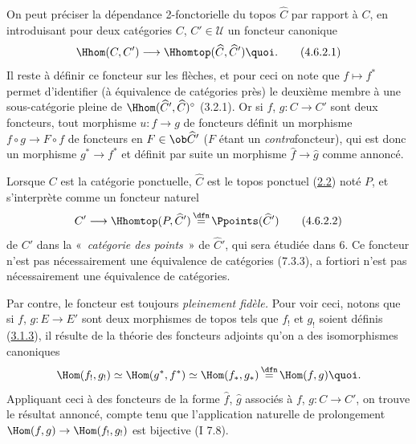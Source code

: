\documentclass[10pt]{../fichiers-configuration-latex/smfart}
\begin{document}
\subsubsection{}
On peut préciser la dépendance 2-fonctorielle du topos
$\widehat{C}$ par rapport à $C$, en introduisant pour deux
catégories $C$, $C'\in 𝒰$ un foncteur canonique
\begin{equation*}
\Hhom(C,C')\longrightarrow
\Hhomtop(\widehat{C},\widehat{C}'){\quoi}.\tag{4.6.2.1}
\end{equation*}
Il reste à définir ce foncteur sur les flèches, et pour ceci
on note que $f\mapsto f^{\ast}$ permet d'identifier (à
équivalence de catégories près) le deuxième membre à une
sous-catégorie pleine de $\Hhom(\widehat{C}',
\widehat{C})^{\circ}$ (3.2.1). Or si $f$, $g:C\rightarrow C'$ sont
deux foncteurs, tout morphisme $u:f\rightarrow g$ de foncteurs
définit un morphisme $f\circ g\rightarrow F\circ f$ de foncteurs
en $F\in \ob \widehat{C}'$ ($F$ étant un \emph{contra}foncteur),
qui est donc un morphisme $g^{\ast}\rightarrow f^{\ast}$ et
définit par suite un morphisme $\widehat{f}\rightarrow
\widehat{g}$ comme annoncé.

Lorsque $C$ est la catégorie ponctuelle, $\widehat{C}$ est le
topos ponctuel (\hyperref[IV.subsec2.2]{2.2}) noté $P$, et 
s'interprète comme un foncteur naturel
\begin{equation*}
C'\longrightarrow \Hhomtop(P,\widehat{C}') \mathop{=}^{\dfn}
\Ppoints(\widehat{C}')\tag{4.6.2.2}
\end{equation*}
de $C'$ dans la « \emph{catégorie des points} » de
$\widehat{C}'$, qui sera étudiée dans 6. Ce\pageoriginale
foncteur n'est pas nécessairement une équivalence de
catégories (7.3.3), a fortiori  n'est pas
nécessairement une équivalence de catégories.

Par contre, le foncteur  est toujours
\emph{pleinement fidèle.} Pour voir ceci, notons que si $f$,
$g:E\rightarrow E'$ sont deux morphismes de topos tels que $f_{!}$
et $g_{!}$ soient définis (\hyperref[IV.subsubsec3.1.3]{3.1.3}), il résulte
de la théorie des foncteurs adjoints qu'on a des isomorphismes
canoniques
$$
\Hom(f_{!},g_{!})\simeq \Hom(g^{\ast}, f^{\ast})\simeq
\Hom(f_{\ast}, g_{\ast}) \mathop{=}^{\dfn} \Hom(f,g){\quoi}.
$$
Appliquant ceci à des foncteurs de la forme $\widehat{f}$,
$\widehat{g}$ associés à $f$, $g:C\rightarrow C'$, on trouve le
résultat annoncé, compte tenu que l'application naturelle de
prolongement $\Hom(f,g)\rightarrow \Hom(f_{!},g_{!})$ est bijective
(I 7.8).
\end{document}
